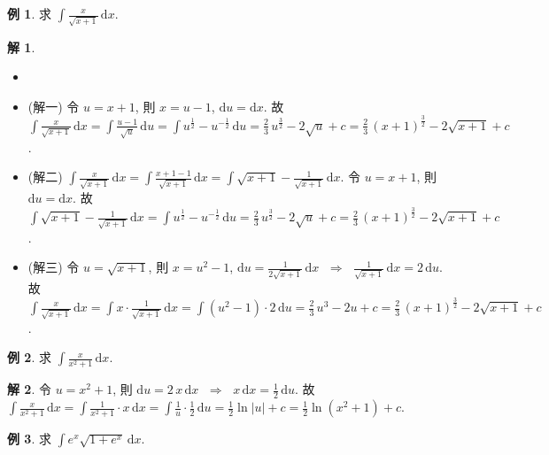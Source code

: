 \documentclass[12pt]{extarticle}
\newcommand{\ds}{\displaystyle}
\newcommand{\ie}{\;\Longrightarrow\;}
\theoremstyle{definition}
\newtheorem*{ex}{例}
\newtheorem*{sol}{解}
\begin{document}
\begin{ex}
  求 $\ds\int\!\frac{x}{\sqrt{x + 1}}\,\mathrm{d}x$. 
\end{ex}

\begin{sol}
  \begin{itemize}
    \item[]
    \item (解一) 令 $\ds u = x + 1$, 則 $\ds x = u - 1$, $\ds\mathrm{d}u = \mathrm{d}x$. 故 $\ds\int\!\frac{x}{\sqrt{x + 1}}\,\mathrm{d}x = \int\!\frac{u - 1}{\sqrt{u}}\,\mathrm{d}u = \int\!u^{\frac{1}{2}} - u^{-\frac{1}{2}}\,\mathrm{d}u = \frac{2}{3}\,u^{\frac{3}{2}} - 2\sqrt{u} + c = \frac{2}{3}\,(x + 1)^{\frac{3}{2}} - 2\sqrt{x + 1} + c$. 
    \item (解二) $\ds\int\!\frac{x}{\sqrt{x + 1}}\,\mathrm{d}x = \int\!\frac{x + 1 - 1}{\sqrt{x + 1}}\,\mathrm{d}x = \int\!\sqrt{x + 1} - \frac{1}{\sqrt{x + 1}}\,\mathrm{d}x$. 令 $\ds u = x + 1$, 則 $\ds\mathrm{d}u = \mathrm{d}x$. 故 $\ds\int\!\sqrt{x + 1} - \frac{1}{\sqrt{x + 1}}\,\mathrm{d}x = \int\!u^{\frac{1}{2}} - u^{-\frac{1}{2}}\,\mathrm{d}u = \frac{2}{3}\,u^{\frac{3}{2}} - 2\sqrt{u} + c = \frac{2}{3}\,(x + 1)^{\frac{3}{2}} - 2\sqrt{x + 1} + c$. 
    \item (解三) 令 $\ds u = \sqrt{x + 1}$, 則 $\ds x = u^2 - 1$, $\ds\mathrm{d}u = \frac{1}{2\sqrt{x + 1}}\,\mathrm{d}x$ $\ie$ $\ds\frac{1}{\sqrt{x + 1}}\,\mathrm{d}x = 2\,\mathrm{d}u$. 故 $\ds\int\!\frac{x}{\sqrt{x + 1}}\,\mathrm{d}x = \int\!x\cdot\frac{1}{\sqrt{x + 1}}\,\mathrm{d}x = \int\!(u^2 - 1)\cdot2\,\mathrm{d}u = \frac{2}{3}\,u^3 - 2u + c = \frac{2}{3}\,(x + 1)^{\frac{3}{2}} - 2\sqrt{x + 1} + c$. 
  \end{itemize}
\end{sol}

\begin{ex}
  求 $\ds\int\!\frac{x}{x^2+1}\,\mathrm{d}x$. 
\end{ex}

\begin{sol}
  令 $\ds u = x^2 + 1$, 則 $\ds\mathrm{d}u = 2\,x\,\mathrm{d}x$ $\ie$ $\ds x\,\mathrm{d}x=\frac{1}{2}\,\mathrm{d}u$. 故 $\ds\int\!\frac{x}{x^2+1}\,\mathrm{d}x = \int\!\frac{1}{x^2+1}\cdot x\,\mathrm{d}x = \int\!\frac{1}{u}\cdot\frac{1}{2}\,\mathrm{d}u = \frac{1}{2}\ln|u| + c = \frac{1}{2}\ln(x^2 + 1) + c$. 
\end{sol}
    
\begin{ex}
  求 $\ds\int e^x\sqrt{1 + e^x}\,\mathrm{d}x$. 
\end{ex}
\end{document}
